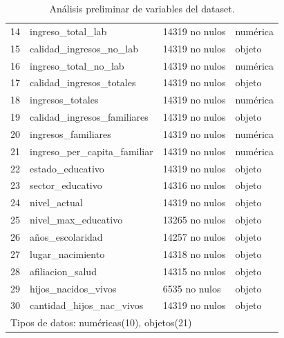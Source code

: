 \documentclass[a4paper]{article}
\begin{document}
\begin{table}[H]
\begin{center}
\begin{tabular}{clll}
    14 & ingreso\_total\_lab           & 14319 no nulos & numérica  \\
    15 & calidad\_ingresos\_no\_lab    & 14319 no nulos & objeto \\
    16 & ingreso\_total\_no\_lab       & 14319 no nulos & numérica  \\
    17 & calidad\_ingresos\_totales    & 14319 no nulos & objeto \\
    18 & ingresos\_totales             & 14319 no nulos & numérica  \\
    19 & calidad\_ingresos\_familiares & 14319 no nulos & objeto \\
    20 & ingresos\_familiares         & 14319 no nulos & numérica  \\
    21 & ingreso\_per\_capita\_familiar & 14319 no nulos & numérica  \\
    22 & estado\_educativo            & 14319 no nulos & objeto \\
    23 & sector\_educativo            & 14316 no nulos & objeto \\
    24 & nivel\_actual                & 14319 no nulos & objeto \\
    25 & nivel\_max\_educativo         & 13265 no nulos & objeto \\
    26 & años\_escolaridad            & 14257 no nulos & objeto \\
    27 & lugar\_nacimiento            & 14318 no nulos & objeto \\
    28 & afiliacion\_salud            & 14315 no nulos & objeto \\
    29 & hijos\_nacidos\_vivos         & 6535 no nulos  & objeto \\
    30 & cantidad\_hijos\_nac\_vivos    & 14319 no nulos & objeto \\
    \bottomrule
    \multicolumn{4}{l}{Tipos de datos: numéricas(10), objetos(21)}  \\
    \end{tabular}\end{center}
    \caption{Análisis preliminar de variables del dataset.}
    \label{Preliminar dataset analysis}
    \end{table}
       
\end{document}
